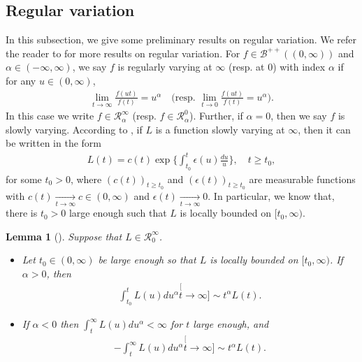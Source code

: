\documentclass[12pt,a4paper]{amsart}
\newtheorem{lem}[thm]{Lemma}
\theoremstyle{definition}
\numberwithin{equation}{section}
\begin{document}
\subsection{Regular variation}
\label{sec: Regularly variation}
In this subsection, we give some preliminary results on regular variation.
We refer the reader to \cite{BinghamGoldieTeugels1989Regular} for more results on  regular variation.
For $f\in \mathscr B^{++}((0,\infty))$ and $\alpha \in (- \infty, \infty)$, we say $f$ is regularly varying at $\infty$ (resp. at $0$) with index $\alpha$ if for any $u \in (0,\infty)$,
\begin{align}
	\lim_{t\to\infty}\frac{f(ut)}{f(t)}
  = u^\alpha
	\quad \Big(\text{resp. } \lim_{t\to 0}\frac{f(u t)}{f(t)}
	= u^\alpha\Big).
\end{align}
In this case we write  $f\in \mathcal R^\infty_\alpha$ (resp. $f\in \mathcal R^0_\alpha$).
Further, if $\alpha = 0$, then we say $f$ is slowly varying.
According to \cite[Theorem 1.3.1]{BinghamGoldieTeugels1989Regular}, if $L$ is a function slowly varying at $\infty$, then it can be written in the form
\begin{align}
	L(t)
	= c(t) \exp\Big\{\int_{t_0}^t \epsilon(u) \frac{du}{u}\Big\},\quad t\geq t_0,
\end{align}
for some $t_0>0$, where $(c(t))_{t\geq t_0}$ and $(\epsilon(t))_{t\geq t_0}$ are measurable functions with $c(t) \xrightarrow[t\to \infty]{} c \in (0,\infty)$ and $\epsilon(t) \xrightarrow[t\to \infty]{} 0$.
In particular, we know that, there is $t_0 > 0$ large enough such that $L$ is locally bounded on $[t_0,\infty)$.

\begin{lem}[{\cite[Propositions 1.5.8 and 1.5.10]{BinghamGoldieTeugels1989Regular}}]
  \label{lem: exchange slowly varying function and integration}
  Suppose that $L\in \mathcal R^\infty_0$.
  \begin{itemize}
  \item
    Let $t_0\in (0,\infty)$ be large enough so that $L$ is locally bounded on $[t_0,\infty)$. If $\alpha>0 $, then
    \begin{align}
      \int_{t_0}^t L(u)du^\alpha
      \stackrel[t\to \infty]{}{\sim} t^\alpha L(t).
    \end{align}
  \item
    If $\alpha< 0$ then $\int_t^\infty L(u) du^\alpha < \infty$ for $t$ large enough, and
    \begin{align}
      -\int_t^\infty L(u)du^\alpha
      \stackrel[t\to \infty]{}{\sim} t^\alpha L(t).
    \end{align}
  \end{itemize}
\end{lem}
\end{document}
